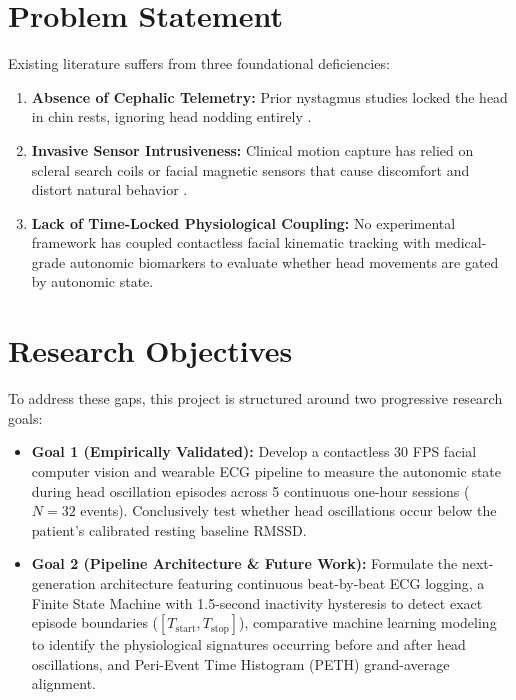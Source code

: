 \documentclass[12pt,a4paper,oneside]{report}
\begin{document}
\section{Problem Statement}
Existing literature suffers from three foundational deficiencies:
\begin{enumerate}[leftmargin=1.5cm, label=\textbf{\arabic*.}]
    \item \textbf{Absence of Cephalic Telemetry:} Prior nystagmus studies locked the head in chin rests, ignoring head nodding entirely \cite{cham2008, cham2013}.
    \item \textbf{Invasive Sensor Intrusiveness:} Clinical motion capture has relied on scleral search coils or facial magnetic sensors that cause discomfort and distort natural behavior \cite{gresty1982, thomas2015}.
    \item \textbf{Lack of Time-Locked Physiological Coupling:} No experimental framework has coupled contactless facial kinematic tracking with medical-grade autonomic biomarkers to evaluate whether head movements are gated by autonomic state.
\end{enumerate}

\section{Research Objectives}
To address these gaps, this project is structured around two progressive research goals:
\begin{itemize}[leftmargin=1.2cm]
    \item \textbf{Goal 1 (Empirically Validated):} Develop a contactless 30 FPS facial computer vision and wearable ECG pipeline to measure the autonomic state during head oscillation episodes across 5 continuous one-hour sessions ($N=32$ events). Conclusively test whether head oscillations occur below the patient's calibrated resting baseline RMSSD.
    \item \textbf{Goal 2 (Pipeline Architecture \& Future Work):} Formulate the next-generation architecture featuring continuous beat-by-beat ECG logging, a Finite State Machine with 1.5-second inactivity hysteresis to detect exact episode boundaries ($[T_{\text{start}}, T_{\text{stop}}]$), comparative machine learning modeling to identify the physiological signatures occurring before and after head oscillations, and Peri-Event Time Histogram (PETH) grand-average alignment.
\end{itemize}

\end{document}

